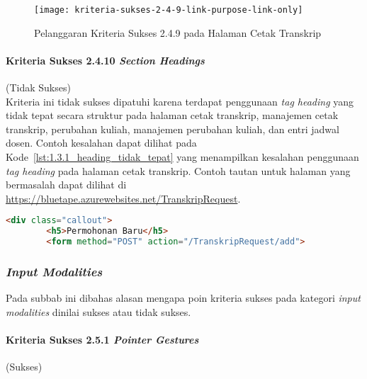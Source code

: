 \begin{figure}[H]
    \centering  
    \texttt{[image: kriteria-sukses-2-4-9-link-purpose-link-only]}  
    \caption[Pelanggaran Kriteria Sukses 2.4.9 pada Halaman Cetak Transkrip]{Pelanggaran Kriteria Sukses 2.4.9 pada Halaman Cetak Transkrip}
    \label{fig:2.4.9_link_purpose_link_only}  
\end{figure} 

\paragraph{Kriteria Sukses 2.4.10 \textit{Section Headings}}
\label{par:kepatuhan_bluetape_kriteria_sukses_2.4.10}
(Tidak Sukses)\\

Kriteria ini tidak sukses dipatuhi karena terdapat penggunaan \textit{tag heading} yang tidak tepat secara struktur pada halaman cetak transkrip, manajemen cetak transkrip, perubahan kuliah, manajemen perubahan kuliah, dan entri jadwal dosen. Contoh kesalahan dapat dilihat pada \mbox{Kode \ref{lst:1.3.1_heading_tidak_tepat}} yang menampilkan kesalahan penggunaan \textit{tag heading} pada halaman cetak transkrip. Contoh tautan untuk halaman yang bermasalah dapat dilihat di \url{https://bluetape.azurewebsites.net/TranskripRequest}.

\begin{lstlisting}[frame=single, label={lst:2.4.10_heading_tidak_tepat}, language=HTML, caption=Pelanggaran Kriteria Sukses 2.4.10 pada Halaman Cetak Transkrip]
    <div class="callout">
        <h5>Permohonan Baru</h5>
        <form method="POST" action="/TranskripRequest/add">
\end{lstlisting}

\subsubsection{\textit{Input Modalities}}
\label{subsubsec:kepatuhan_bluetape_input_modalities}
Pada subbab ini dibahas alasan mengapa poin kriteria sukses pada kategori \textit{input modalities} dinilai sukses atau tidak sukses.

\paragraph{Kriteria Sukses 2.5.1 \textit{Pointer Gestures}}
\label{par:kepatuhan_bluetape_kriteria_sukses_2.5.1}
(Sukses)\\

